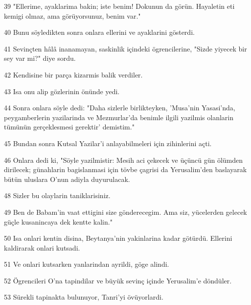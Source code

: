 \par 39 "Ellerime, ayaklarima bakin; iste benim! Dokunun da görün. Hayaletin eti kemigi olmaz, ama görüyorsunuz, benim var."
\par 40 Bunu söyledikten sonra onlara ellerini ve ayaklarini gösterdi.
\par 41 Sevinçten hâlâ inanamayan, saskinlik içindeki ögrencilerine, "Sizde yiyecek bir sey var mi?" diye sordu.
\par 42 Kendisine bir parça kizarmis balik verdiler.
\par 43 Isa onu alip gözlerinin önünde yedi.
\par 44 Sonra onlara söyle dedi: "Daha sizlerle birlikteyken, 'Musa'nin Yasasi'nda, peygamberlerin yazilarinda ve Mezmurlar'da benimle ilgili yazilmis olanlarin tümünün gerçeklesmesi gerektir' demistim."
\par 45 Bundan sonra Kutsal Yazilar'i anlayabilmeleri için zihinlerini açti.
\par 46 Onlara dedi ki, "Söyle yazilmistir: Mesih aci çekecek ve üçüncü gün ölümden dirilecek; günahlarin bagislanmasi için tövbe çagrisi da Yerusalim'den baslayarak bütün uluslara O'nun adiyla duyurulacak.
\par 48 Sizler bu olaylarin taniklarisiniz.
\par 49 Ben de Babam'in vaat ettigini size gönderecegim. Ama siz, yücelerden gelecek güçle kusanincaya dek kentte kalin."
\par 50 Isa onlari kentin disina, Beytanya'nin yakinlarina kadar götürdü. Ellerini kaldirarak onlari kutsadi.
\par 51 Ve onlari kutsarken yanlarindan ayrildi, göge alindi.
\par 52 Ögrencileri O'na tapindilar ve büyük sevinç içinde Yerusalim'e döndüler.
\par 53 Sürekli tapinakta bulunuyor, Tanri'yi övüyorlardi.


